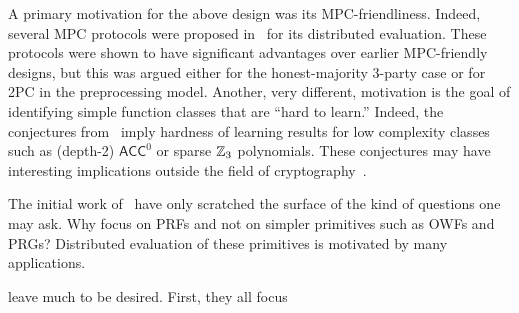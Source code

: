 \iffalse
The main technique by which we achieve all three of our design goals is to consider alternating linear functions over different (prime) moduli. The only nonlinear part of the constructions will now be to switch between the different moduli, which leads to a very small round complexity. Furthermore, Boneh et al.~\cite{boneh2018-darkmatter} showed that linear functions over one moduli cannot be well approximated by low degree polynomials over a different moduli. Consequently, even a simple design that alternates between different moduli can result in a highly non-linear overall computation. In other words, this approach provides high algebraic degree with low nonlinear depth. 

As the simplest possible instance of this approach, we consider alternating linear functions over $\Z_2$ and $\Z_3$. Boneh et al. found that linear functions over $\Z_2$ are highly nonlinear over $\Z_3$ while linear functions over $\Z_3$ are highly nonlinear over $\Z_2$. Furthermore, using small moduli allows for efficient designs for ``switching'' between the moduli. In fact, we show how conversions between the moduli are “small” nonlinear gates and can be implemented efficiently from OT and VOLE correlations.
\fi

A primary motivation for the above design was its MPC-friendliness. Indeed, several MPC protocols were proposed in~\cite{boneh2018-darkmatter} for its distributed evaluation. These protocols were shown to have significant advantages over earlier MPC-friendly designs, but this was argued either for the honest-majority 3-party case or for 2PC in the preprocessing model. Another, very different, motivation is the goal of identifying simple function classes that are ``hard to learn.''  Indeed,  the conjectures from~\cite{boneh2018-darkmatter} imply hardness of learning results for low complexity classes such as (depth-2) $\mathsf{ACC}^0$ or sparse $\Z_3$ polynomials. These conjectures may have interesting implications outside the field of cryptography~\cite{complexity-theory-works}.

The initial work of~\cite{boneh2018-darkmatter,adventures} have only scratched the surface of the kind of questions one may ask. Why focus on PRFs and not on simpler primitives such as OWFs and PRGs? Distributed evaluation of these primitives is motivated by many applications. 

leave much to be desired. First, they all focus 



